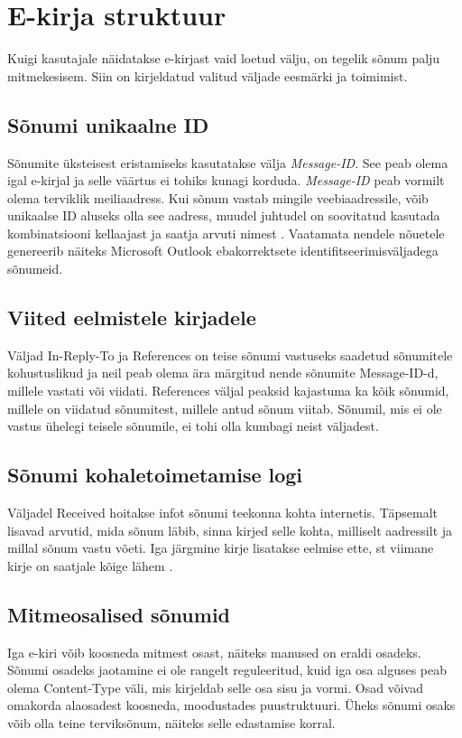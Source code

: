 \documentclass[]{trkuur}
\let\eng\emph
\let\enp\eng
\begin{document}
\chapter{E-kirja struktuur}
Kuigi kasutajale näidatakse e-kirjast vaid loetud välju, on tegelik sõnum palju
mitmekesisem. Siin on kirjeldatud valitud väljade eesmärki ja toimimist.

\section{Sõnumi unikaalne ID}
Sõnumite üksteisest eristamiseks kasutatakse välja \enp{Message-ID}. See peab olema igal
e-kirjal ja selle väärtus ei tohiks kunagi korduda. \enp{Message-ID} peab vormilt olema
terviklik meiliaadress.
Kui sõnum vastab mingile veebiaadressile, võib
unikaalse ID aluseks olla see aadress, muudel juhtudel on soovitatud kasutada
kombinatsiooni kellaajast ja saatja arvuti nimest \autocite{rfc2111}. Vaatamata
nendele nõuetele genereerib näiteks Microsoft Outlook ebakorrektsete
identifitseerimisväljadega sõnumeid. \autocite{wiki-message-id}

\section{Viited eelmistele kirjadele}
Väljad In-Reply-To ja References on teise sõnumi vastuseks saadetud sõnumitele kohustuslikud ja neil
peab olema ära märgitud nende sõnumite Message-ID-d, millele vastati või
viidati.
References väljal peaksid kajastuma ka kõik sõnumid, millele on viidatud
sõnumitest, millele antud sõnum viitab. Sõnumil, mis ei ole vastus ühelegi
teisele sõnumile, ei tohi olla kumbagi neist väljadest. \autocite{rfc5322}

\section{Sõnumi kohaletoimetamise logi}
Väljadel Received hoitakse infot sõnumi teekonna kohta internetis. Täpsemalt lisavad arvutid, mida
sõnum läbib, sinna kirjed selle kohta, milliselt aadressilt ja millal sõnum vastu
võeti. Iga järgmine kirje lisatakse eelmise ette, st viimane kirje on saatjale
kõige lähem \autocite{readheaders}. 
\autocite{rfc5322}
\autocite{rfc5321}

\section{Mitmeosalised sõnumid}
Iga e-kiri võib koosneda mitmest osast, näiteks manused on eraldi osadeks.
Sõnumi osadeks jaotamine ei ole rangelt reguleeritud, kuid iga osa alguses peab
olema Content-Type väli, mis kirjeldab selle osa sisu ja vormi. Osad võivad
omakorda alaosadest koosneda, moodustades puustruktuuri. Üheks sõnumi osaks võib
olla teine terviksõnum, näiteks selle edastamise korral.
\autocite{rfc1521}
\end{document}
